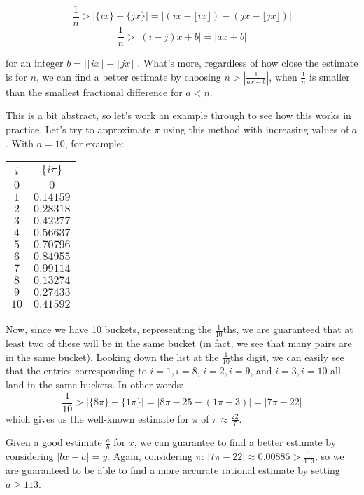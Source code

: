 \documentclass{article}
\begin{document}
\[ \frac{1}{n} > |\{ix\}-\{jx\}| = | (ix-\lfloor ix \rfloor) - (jx - \lfloor jx \rfloor) | \]
\[ \frac{1}{n} > | (i-j)x  + b | = | ax+b | \]

for an integer $b = |\lfloor ix \rfloor - \lfloor jx \rfloor|$. What's more, regardless of how close
the estimate is for $n$, we can find a better estimate by choosing $n > |\frac{1}{ax-b}|$, when
$\frac{1}{n}$ is smaller than the smallest fractional difference for $a<n$.

This is a bit abstract, so let's work an example through to see how this works in practice. Let's try
to approximate $\pi$ using this method with increasing values of $a$. With $a=10$, for example:

\begin{center}
	\begin{tabular}{|c|c|}
		\hline
		$i$ & $\{i\pi\}$ \\
		\hline
		$0$ & $0$ \\
		$1$ & $0.14159$ \\
		$2$ & $0.28318$ \\
		$3$ & $0.42277$ \\
		$4$ & $0.56637$ \\
		$5$ & $0.70796$ \\
		$6$ & $0.84955$ \\
		$7$ & $0.99114$ \\
		$8$ & $0.13274$ \\
		$9$ & $0.27433$ \\
		$10$ & $0.41592$ \\
		\hline
	\end{tabular}
\end{center}

Now, since we have 10 buckets, representing the $\frac{1}{10}$ths, we are guaranteed that at
least two of these will be in the same bucket (in fact, we see that many pairs are in the same
bucket). Looking down the list at the $\frac{1}{10}$ths digit, we can easily see that the
entries corresponding to $i=1, i=8$, $i=2, i=9$, and $i=3, i=10$ all land in the same buckets.
In other words:
\[ \frac{1}{10}> |\{8\pi\}-\{1\pi\}| = | 8\pi - 25 - (1\pi - 3)| = |7\pi -22| \]
which gives us the well-known estimate for $\pi$ of $\pi \approx \frac{22}{7}$. 

Given a good estimate $\frac{a}{b}$ for $x$, we can guarantee to find a better estimate by 
considering $|bx-a| = y$. Again, considering $\pi$: $|7\pi - 22| \approx 0.00885 > 
\frac{1}{113}$, so we are guaranteed to be able to find a more accurate rational estimate by setting
$a \geq 113$.
\end{document}
